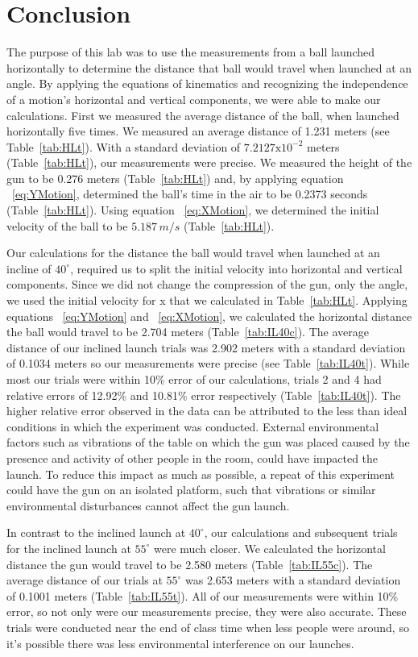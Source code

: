 
\section{Conclusion}

\vspace{-0.5cm}
\singlespacing

The purpose of this lab was to use the measurements from a ball launched horizontally to determine the distance that ball would travel when launched at an angle. By applying the equations of kinematics and recognizing the independence of a motion's horizontal and vertical components, we were able to make our calculations. First we measured the average distance of the ball, when launched horizontally five times. We measured an average distance of 1.231 meters (see Table~\ref{tab:HLt}). With a standard deviation of $7.2127\text{x}10^{-2}$ meters (Table~\ref{tab:HLt}), our measurements were precise. We measured the height of the gun to be 0.276 meters (Table~\ref{tab:HLt}) and, by applying equation ~\ref{eq:YMotion}, determined the ball's time in the air to be 0.2373 seconds (Table~\ref{tab:HLt}). Using equation ~\ref{eq:XMotion}, we determined the initial velocity of the ball to be $5.187\,m/s$ (Table~\ref{tab:HLt}).\par
Our calculations for the distance the ball would travel when launched at an incline of $40^\circ$, required us to split the initial velocity into horizontal and vertical components. Since we did not change the compression of the gun, only the angle, we used the initial velocity for x that we calculated in Table~\ref{tab:HLt}. Applying equations ~\ref{eq:YMotion} and ~\ref{eq:XMotion}, we calculated the horizontal distance the ball would travel to be 2.704 meters (Table~\ref{tab:IL40c}). The average distance of our inclined launch trials was  2.902 meters with a standard deviation of 0.1034 meters so our measurements were precise (see Table~\ref{tab:IL40t}). While most our trials were within 10\% error of our calculations, trials 2 and 4 had relative errors of 12.92\% and 10.81\% error respectively (Table~\ref{tab:IL40t}). The higher relative error observed in the data can be attributed to the less than ideal conditions in which the experiment was conducted. External environmental factors such as vibrations of the table on which the gun was placed caused by the presence and activity of other people in the room, could have impacted the launch. To reduce this impact as much as possible, a repeat of this experiment could have the gun on an isolated platform, such that vibrations or similar environmental disturbances cannot affect the gun launch. \par
In contrast to the inclined launch at $40^\circ$, our calculations and subsequent trials for the inclined launch at $55^\circ$ were much closer. We calculated the horizontal distance the gun would travel to be 2.580 meters (Table~\ref{tab:IL55c}). The average distance of our trials at $55^\circ$ was 2.653 meters with a standard deviation of 0.1001 meters (Table~\ref{tab:IL55t}). All of our measurements were within 10\% error, so not only were our measurements precise, they were also accurate. These trials were conducted near the end of class time when less people were around, so it's possible there was less environmental interference on our launches. 
